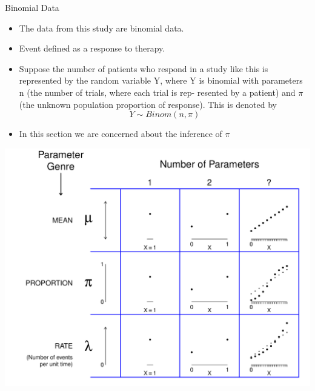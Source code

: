 \documentclass[10pt,handout]{beamer}\usepackage[]{graphicx}\usepackage[]{color}
\makeatletter
\def\maxwidth{ %
  \ifdim\Gin@nat@width>\linewidth
    \linewidth
  \else
    \Gin@nat@width
  \fi
}
\newenvironment{knitrout}{}{} %
\makeatother
\begin{document}
\begin{frame}{Binomial Data}
\begin{itemize}
	\item The data from this study are binomial data. 
	\item Event defined as a response to therapy.
	\item Suppose the number of patients who respond in a study like this is represented by the random
	variable Y, where Y is binomial with parameters n (the number of trials, where each trial is rep-
	resented by a patient) and $\pi$ (the unknown population proportion of response). This is denoted by $$Y\sim Binom(n,\pi)$$
	\item In this section we are concerned about the inference of $\pi$
\end{itemize}
\end{frame}



\begin{frame}
\begin{knitrout}\tiny
{}\color{fgcolor}

{\centering \includegraphics[width=\maxwidth]{figure/unnamed-chunk-2-1} 

}


\end{knitrout}
\end{frame}
\end{document}
